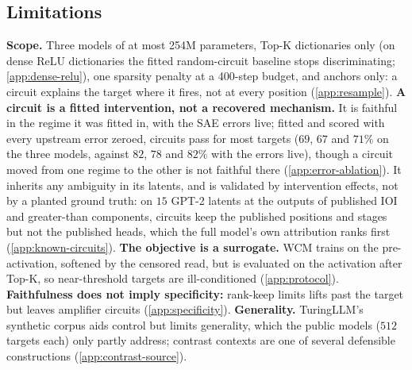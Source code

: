 \documentclass[10pt]{article}
\begin{document}
\def\frameworkpart{main}

\subsection{Limitations}
\label{sec:limitations}
\textbf{Scope.} Three models of at most 254M parameters, Top-K dictionaries only (on dense ReLU dictionaries the fitted random-circuit baseline stops discriminating; \cref{app:dense-relu}), one sparsity penalty at a 400-step budget, and anchors only: a circuit explains the target where it fires, not at every position (\cref{app:resample}).
\textbf{A circuit is a fitted intervention, not a recovered mechanism.} %
It is faithful in the regime it was fitted in, with the SAE errors live; fitted and scored with every upstream error zeroed, circuits pass for most targets ($69$, $67$ and $71\%$ on the three models, against $82$, $78$ and $82\%$ with the errors live), though a circuit moved from one regime to the other is not faithful there (\cref{app:error-ablation}). It inherits any ambiguity in its latents, and is validated by intervention effects, not by a planted ground truth: on $15$ GPT-2 latents at the outputs of published IOI and greater-than components, circuits keep the published positions and stages but not the published heads, which the full model's own attribution ranks first (\cref{app:known-circuits}).
\textbf{The objective is a surrogate.} WCM trains on the pre-activation, softened by the censored read, but is evaluated on the activation after Top-K, so near-threshold targets are ill-conditioned (\cref{app:protocol}).
\textbf{Faithfulness does not imply specificity:} rank-keep limits lifts past the target but leaves amplifier circuits (\cref{app:specificity}).
\textbf{Generality.} TuringLLM's synthetic corpus aids control but limits generality, which the public models ($512$ targets each) only partly address; contrast contexts are one of several defensible constructions (\cref{app:contrast-source}).
\end{document}
